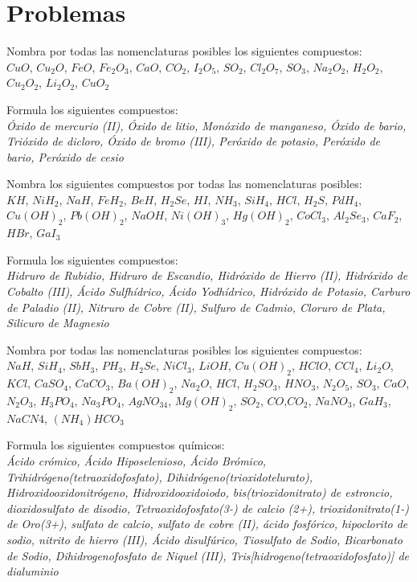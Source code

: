 \documentclass[11pt,fleqn]{book} %
\begin{document}
\section{Problemas}
\begin{problem}
	Nombra por todas las nomenclaturas posibles los siguientes compuestos: \\ $CuO$, $Cu_2O$, $FeO$, $Fe_2O_3$, $CaO$, $CO_2$, $I_2O_5$, $SO_2$, $Cl_2O_7$, $SO_3$, $Na_2O_2$, $H_2O_2$, $Cu_2O_2$, $Li_2O_2$, $CuO_2$ \\
\end{problem}
\begin{problem}
	Formula los siguientes compuestos:\\ \textit{Óxido de mercurio (II), Óxido de litio, Monóxido de manganeso, Óxido de bario, Trióxido de dicloro, Óxido de bromo (III), Peróxido de potasio, Peróxido de bario, Peróxido de cesio}\\
\end{problem}
\begin{problem}
	Nombra los siguientes compuestos por todas las nomenclaturas posibles:\\ $KH$, $NiH_2$, $NaH$, $FeH_2$, $BeH$, $H_2Se$, $HI$, $NH_3$, $SiH_4$, $HCl$, $H_2S$, $PdH_4$, $Cu(OH)_2$, $Pb(OH)_2$, $NaOH$, $Ni(OH)_3$, $Hg(OH)_2$, $CoCl_3$, $Al_2Se_3$, $CaF_2$, $HBr$, $GaI_3$ \\
\end{problem}
\begin{problem}
	Formula los siguientes compuestos:\\ \textit{Hidruro de Rubidio, Hidruro de Escandio, Hidróxido de Hierro (II), Hidróxido de Cobalto (III), Ácido Sulfhídrico, Ácido Yodhídrico, Hidróxido de Potasio, Carburo de Paladio (II), Nitruro de Cobre (II), Sulfuro de Cadmio, Cloruro de Plata, Silicuro de Magnesio}\\
\end{problem}
\begin{problem}
	Nombra por todas las nomenclaturas posibles los siguientes compuestos:\\ $NaH$, $SiH_4$, $SbH_3$, $PH_3$, $H_2Se$, $NiCl_3$, $LiOH$, $Cu(OH)_2$, $HClO$, $CCl_4$, $Li_2O$, $KCl$, $CaSO_4$, $CaCO_3$, $Ba(OH)_2$, $Na_2O$, $HCl$, $H_2SO_3$, $HNO_3$, $N_2O_5$, $SO_3$, $CaO$, $N_2O_3$, $H_3PO_4$, $Na_3PO_4$, $AgNO_34$, $Mg(OH)_2$, $SO_2$, $CO$,$CO_2$, $NaNO_3$, $GaH_3$, $NaCN4$, $(NH_4)HCO_3$\\
\end{problem}
\begin{problem}
	Formula los siguientes compuestos químicos:\\ \textit{Ácido crómico, Ácido Hiposelenioso, Ácido Brómico, Trihidrógeno(tetraoxidofosfato), Dihidrógeno(trioxidotelurato),  Hidroxidooxidonitrógeno, Hidroxidooxidoiodo, bis(trioxidonitrato) de estroncio, dioxidosulfato de disodio, Tetraoxidofosfato(3-) de calcio (2+), trioxidonitrato(1-) de Oro(3+), sulfato de calcio, sulfato de cobre (II), ácido fosfórico, hipoclorito de sodio, nitrito de hierro (III), Ácido disulfúrico, Tiosulfato de Sodio, Bicarbonato de Sodio, Dihidrogenofosfato de Niquel (III), Tris[hidrogeno(tetraoxidofosfato)] de dialuminio}\\
\end{problem}
\end{document}
